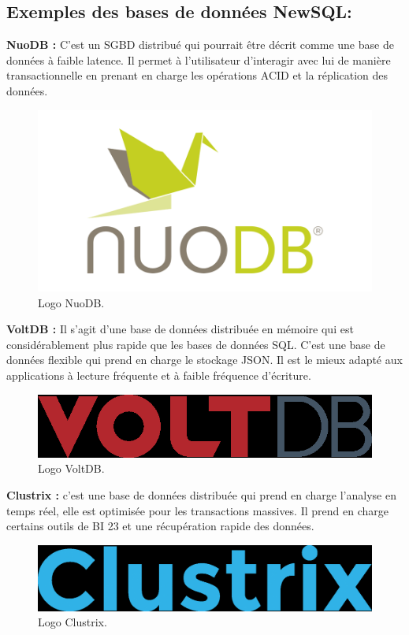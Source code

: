 \subsection{Exemples des bases de données NewSQL:}
\textbf{NuoDB :} C'est un SGBD distribué qui pourrait être décrit comme une base de données à faible latence. Il permet à l'utilisateur d'interagir avec lui de manière transactionnelle en prenant en charge les opérations ACID et la réplication des données. 

\begin{figure}[h]
	\centering
    \includegraphics[scale=0.2]{img/4.15}
    \caption{Logo NuoDB.}
\end{figure}


\textbf{VoltDB :} Il s'agit d'une base de données distribuée en mémoire qui est considérablement plus rapide que les bases de données SQL. C’est une base de données flexible qui prend en charge le stockage JSON. Il est le mieux adapté aux applications à lecture fréquente et à faible fréquence d'écriture.

\begin{figure}[h]
	\centering
    \includegraphics[scale=0.2]{img/4.16}
    \caption{Logo VoltDB.}
\end{figure}

\textbf{Clustrix :} c'est une base de données distribuée qui prend en charge l'analyse en temps réel, elle est optimisée pour les transactions massives. Il prend en charge certains outils de BI 23 et une récupération rapide des données.

\begin{figure}[h]
	\centering
    \includegraphics[scale=0.1]{img/4.17}
    \caption{Logo Clustrix.}
\end{figure}





